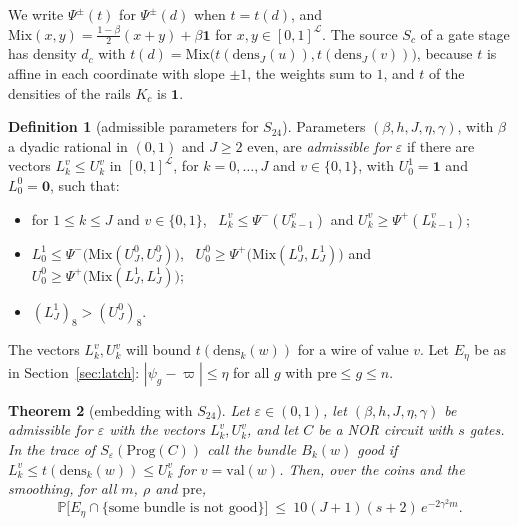 \documentclass[11pt]{amsart}
\newtheorem{theorem}{Theorem}
\theoremstyle{definition}
\newtheorem{definition}[theorem]{Definition}
\theoremstyle{remark}
\newcommand{\eps}{\varepsilon}
\newcommand{\val}{\mathrm{val}}
\newcommand{\PP}{\mathbb{P}}
\begin{document}
We write $\Psi^\pm(t)$ for $\Psi^\pm(d)$ when $t=t(d)$, and $\mathrm{Mix}(x,y)=\frac{1-\beta}2(x+y)+\beta\mathbf 1$
for $x,y\in[0,1]^\mathcal L$. The source $S_c$ of a gate stage has density $d_c$ with
$t(d)=\mathrm{Mix}\bigl(t(\mathrm{dens}_J(u)),t(\mathrm{dens}_J(v))\bigr)$, because $t$ is affine in each
coordinate with slope $\pm1$, the weights sum to $1$, and $t$ of the densities of the rails $K_c$
is $\mathbf 1$.

\begin{definition}[admissible parameters for $S_{24}$]\label{def:adms24}
Parameters $(\beta,h,J,\eta,\gamma)$, with $\beta$ a dyadic rational in $(0,1)$ and $J\ge2$ even, are
\emph{admissible for} $\eps$ if there are vectors $L^v_k\le U^v_k$ in $[0,1]^\mathcal L$, for
$k=0,\dots,J$ and $v\in\{0,1\}$, with $U^1_0=\mathbf 1$ and $L^0_0=\mathbf 0$, such that:
\begin{itemize}[leftmargin=3em]
\item[(R)] for $1\le k\le J$ and $v\in\{0,1\}$,
\ $L^v_k\le\Psi^-(U^v_{k-1})$ and $U^v_k\ge\Psi^+(L^v_{k-1})$;
\item[(G)] $L^1_0\le\Psi^-\bigl(\mathrm{Mix}(U^0_J,U^0_J)\bigr)$,
\ $U^0_0\ge\Psi^+\bigl(\mathrm{Mix}(L^0_J,L^1_J)\bigr)$ and
\ $U^0_0\ge\Psi^+\bigl(\mathrm{Mix}(L^1_J,L^1_J)\bigr)$;
\item[(V)] $(L^1_J)_8>(U^0_J)_8$.
\end{itemize}
\end{definition}

\noindent The vectors $L^v_k,U^v_k$ will bound $t(\mathrm{dens}_k(w))$ for a wire of value $v$. Let
$E_\eta$ be as in Section~\ref{sec:latch}: $|\psi_g-\varpi|\le\eta$ for all $g$ with
$\mathrm{pre}\le g\le n$.

\begin{theorem}[embedding with $S_{24}$]\label{thm:progembed}
Let $\eps\in(0,1)$, let $(\beta,h,J,\eta,\gamma)$ be admissible for $\eps$ with the vectors
$L^v_k,U^v_k$, and let $C$ be a NOR circuit with $s$ gates. In the trace of $S_\eps(\mathrm{Prog}(C))$
call the bundle $B_k(w)$ \emph{good} if $L^v_k\le t(\mathrm{dens}_k(w))\le U^v_k$ for
$v=\val(w)$. Then, over the coins and the smoothing, for all $m$, $\rho$ and $\mathrm{pre}$,
\[
\PP\bigl[E_\eta\cap\{\text{some bundle is not good}\}\bigr]\ \le\ 10(J+1)(s+2)\,e^{-2\gamma^2m}.
\]
\end{theorem}
\end{document}
